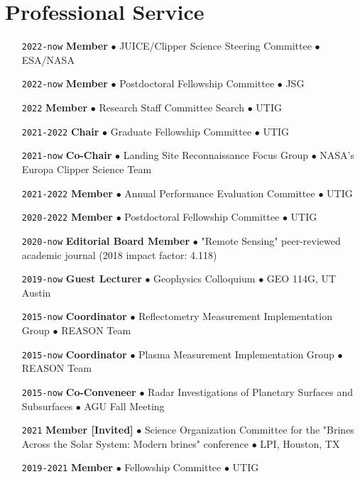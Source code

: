 \section*{Professional Service}

\begin{itemize}[leftmargin=5.8em, labelsep=1.5em]
    \setlength\itemsep{-.5em}
    \item[\texttt{2022-now}] \textbf{Member} $\bullet$ JUICE/Clipper Science Steering Committee $\bullet$ ESA/NASA
    \item[\texttt{2022-now}] \textbf{Member} $\bullet$ Postdoctoral Fellowship Committee $\bullet$ JSG
    \item[\texttt{2022}] \textbf{Member} $\bullet$ Research Staff Committee Search $\bullet$ UTIG
    \item[\texttt{2021-2022}] \textbf{Chair} $\bullet$ Graduate Fellowship Committee $\bullet$ UTIG
    \item[\texttt{2021-now}] \textbf{Co-Chair} $\bullet$ Landing Site Reconnaissance Focus Group  $\bullet$ NASA's Europa Clipper Science Team
    \item[\texttt{2021-2022}] \textbf{Member} $\bullet$ Annual Performance Evaluation Committee $\bullet$ UTIG
    \item[\texttt{2020-2022}] \textbf{Member} $\bullet$ Postdoctoral Fellowship Committee $\bullet$ UTIG
    \item[\texttt{2020-now}] \textbf{Editorial Board Member} $\bullet$ "Remote Sensing" peer-reviewed academic journal (2018 impact factor: 4.118)
    \item[\texttt{2019-now}] \textbf{Guest Lecturer} $\bullet$ Geophysics Colloquium $\bullet$  GEO 114G, UT Austin
    \item[\texttt{2015-now}] \textbf{Coordinator} $\bullet$ Reflectometry Measurement Implementation Group $\bullet$ REASON Team
    \item[\texttt{2015-now}] \textbf{Coordinator} $\bullet$ Plasma Measurement Implementation Group $\bullet$ REASON Team
    \item[\texttt{2015-now}] \textbf{Co-Conveneer} $\bullet$  Radar Investigations of Planetary Surfaces and Subsurfaces $\bullet$ AGU Fall Meeting
    \item[\texttt{2021}] \textbf{Member [Invited]} $\bullet$ Science Organization Committee for the "Brines Across the Solar System: Modern brines" conference $\bullet$ LPI, Houston, TX
    \item[\texttt{2019-2021}] \textbf{Member} $\bullet$ Fellowship Committee $\bullet$ UTIG

\end{itemize}

